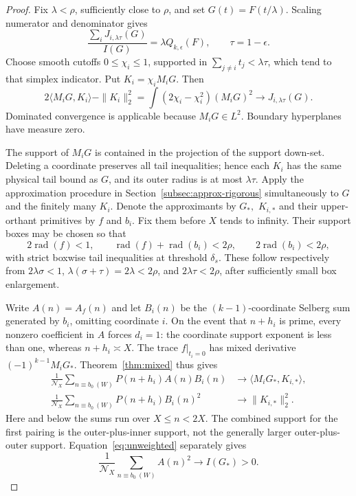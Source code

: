 \documentclass[11pt,a4paper]{article}
\theoremstyle{definition}\newtheorem{definition}[theorem]{Definition}
\theoremstyle{remark}\newtheorem{remark}[theorem]{Remark}
\numberwithin{equation}{section}
\begin{document}
\begin{proof}
Fix $\lambda<\rho$, sufficiently close to $\rho$, and set $G(t)=F(t/\lambda)$. Scaling numerator and denominator gives
\begin{equation}\label{eq:scaling-first}
 \frac{\sum_iJ_{i,\lambda\tau}(G)}{I(G)}
 =\lambda Q_{k,\epsilon}(F),\qquad \tau=1-\epsilon.
\end{equation}
Choose smooth cutoffs $0\le\chi_i\le1$, supported in $\sum_{j\ne i}t_j<\lambda\tau$, which tend to that simplex indicator. Put $K_i=\chi_iM_iG$. Then
\begin{equation}\label{eq:completion-integral}
 2\langle M_iG,K_i\rangle-\|K_i\|_2^2
 =\int(2\chi_i-\chi_i^2)(M_iG)^2
 \longrightarrow J_{i,\lambda\tau}(G).
\end{equation}
Dominated convergence is applicable because $M_iG\in L^2$. Boundary hyperplanes have measure zero.

The support of $M_iG$ is contained in the projection of the support down-set. Deleting a coordinate preserves all tail inequalities; hence each $K_i$ has the same physical tail bound as $G$, and its outer radius is at most $\lambda\tau$. Apply the approximation procedure in Section~\ref{subsec:approx-rigorous} simultaneously to $G$ and the finitely many $K_i$. Denote the approximants by $G_*,$ $K_{i,*}$ and their upper-orthant primitives by $f$ and $b_i$. Fix them before $X$ tends to infinity. Their support boxes may be chosen so that
\[
 2\operatorname{rad}(f)<1,\qquad
 \operatorname{rad}(f)+\operatorname{rad}(b_i)<2\rho,\qquad
 2\operatorname{rad}(b_i)<2\rho,
\]
with strict boxwise tail inequalities at threshold $\delta_s$. These follow respectively from $2\lambda\sigma<1$, $\lambda(\sigma+\tau)=2\lambda<2\rho$, and $2\lambda\tau<2\rho$, after sufficiently small box enlargement.

Write $A(n)=A_f(n)$ and let $B_i(n)$ be the $(k-1)$-coordinate Selberg sum generated by $b_i$, omitting coordinate $i$. On the event that $n+h_i$ is prime, every nonzero coefficient in $A$ forces $d_i=1$: the coordinate support exponent is less than one, whereas $n+h_i\asymp X$. The trace $f|_{t_i=0}$ has mixed derivative $(-1)^{k-1}M_iG_*$. Theorem~\ref{thm:mixed} thus gives
\begin{align}
 \frac1{\mathcal N_X}\sum_{n\equiv b_0\ (W)}P(n+h_i)A(n)B_i(n)
 &\longrightarrow \langle M_iG_*,K_{i,*}\rangle,\label{eq:cross-limit}\\
 \frac1{\mathcal N_X}\sum_{n\equiv b_0\ (W)}P(n+h_i)B_i(n)^2
 &\longrightarrow \|K_{i,*}\|_2^2.\label{eq:inner-limit}
\end{align}
Here and below the sums run over $X\le n<2X$. The combined support for the first pairing is the outer-plus-inner support, not the generally larger outer-plus-outer support. Equation~\eqref{eq:unweighted} separately gives
\[
 \frac1{\mathcal N_X}\sum_{n\equiv b_0\ (W)}A(n)^2\longrightarrow I(G_*)>0.
\]


\end{proof}
\end{document}
